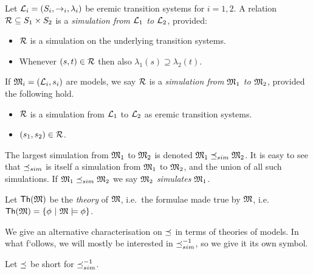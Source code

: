 \begin{definition}
Let $\mathcal{L}_i = (S_i, \rightarrow_i, \lambda_i)$ be eremic transition
systems for $i = 1, 2$.  A relation $\mathcal{R} \subseteq S_1 \times S_2$ is
a \emph{simulation from $\mathcal{L}_1$ to $\mathcal{L}_2$}, provided:
\begin{itemize} 

\item $\mathcal{R}$ is a simulation on the underlying transition systems. 

\item Whenever $(s, t) \in \mathcal{R}$ then also $\lambda_1(s) \supseteq
  \lambda_2(t)$.

\end{itemize}

\NI If $\frak{M}_i = (\mathcal{L}_i, s_i)$ are models, we say $\mathcal{R}$ is a
\emph{simulation from $\frak{M}_1$ to $\frak{M}_2$}, provided the following hold.

\begin{itemize}

\item $\mathcal{R}$ is a simulation from $\mathcal{L}_1$ to $\mathcal{L}_2$ as eremic transition systems.

\item  $(s_1, s_2) \in \mathcal{R}$. 

\end{itemize}
\end{definition}

\begin{definition}
The largest simulation from $\frak{M}_1$ to $\frak{M}_2$ is denoted $\frak{M}_1
\preceq_{sim} \frak{M}_2$.  It is easy to see that $\preceq_{sim}$ is itself a
simulation from $\frak{M}_1$ to $\frak{M}_2$, and the union of all such
simulations.  If $\frak{M}_1 \preceq_{sim} \frak{M}_2$ we say $\frak{M}_2$
\emph{simulates} $\frak{M}_1$.
\end{definition}

\begin{definition}
Let $\mathsf{Th}(\frak{M})$ be the \emph{theory} of $\frak{M}$, i.e.~the formulae
made true by $\frak{M}$, i.e.~$\mathsf{Th}(\frak{M}) = \{\phi\ |\ \frak{M} \models
\phi \}$.
\end{definition}

\NI We give an alternative characterisation on $\preceq$ in terms of
theories of models. In what f`ollows, we will mostly be interested in
$\preceq_{sim}^{-1}$, so we give it its own symbol.

\begin{definition}
Let $\preceq$  be short for $\preceq_{sim}^{-1}$.
\end{definition}





